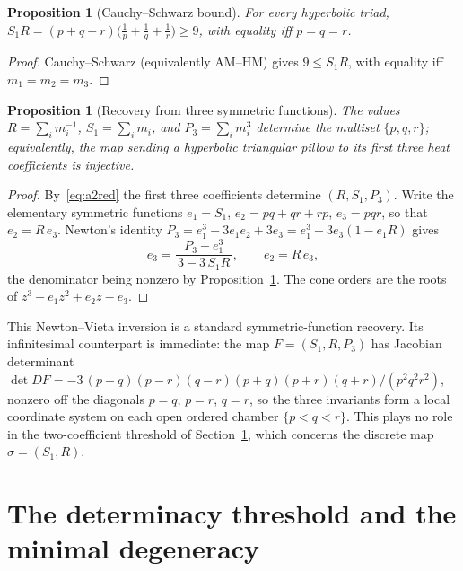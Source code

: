 \documentclass[12pt, letterpaper]{article}
\theoremstyle{definition}
\theoremstyle{plain}
\newtheorem{proposition}[theorem]{Proposition}
\begin{document}
\begin{proposition}[Cauchy--Schwarz bound]\label{prop:cs}
For every hyperbolic triad, $S_1 R=(p+q+r)\big(\tfrac1p+\tfrac1q+\tfrac1r\big)\ge 9$, with equality iff $p=q=r$.
\end{proposition}

\begin{proof}
Cauchy--Schwarz (equivalently AM--HM) gives $9\le S_1 R$, with equality iff $m_1=m_2=m_3$.
\end{proof}

\begin{proposition}[Recovery from three symmetric functions]\label{prop:recovery}
The values $R=\sum_i m_i^{-1}$, $S_1=\sum_i m_i$, and $P_3=\sum_i m_i^{3}$ determine the multiset $\{p,q,r\}$; equivalently, the map sending a hyperbolic triangular pillow to its first three heat coefficients is injective.
\end{proposition}

\begin{proof}
By~\eqref{eq:a2red} the first three coefficients determine $(R,S_1,P_3)$. Write the elementary symmetric functions $e_1=S_1$, $e_2=pq+qr+rp$, $e_3=pqr$, so that $e_2=R\,e_3$. Newton's identity $P_3=e_1^3-3e_1e_2+3e_3=e_1^3+3e_3(1-e_1R)$ gives
\begin{equation}
    e_3=\frac{P_3-e_1^{3}}{\,3-3\,S_1 R\,},\qquad e_2=R\,e_3,
    \label{eq:e3}
\end{equation}
the denominator being nonzero by Proposition~\ref{prop:cs}. The cone orders are the roots of $z^3-e_1 z^2+e_2 z-e_3$.
\end{proof}

This Newton--Vieta inversion is a standard symmetric-function recovery. Its infinitesimal counterpart is immediate: the map $F=(S_1,R,P_3)$ has Jacobian determinant $\det DF=-3\,(p-q)(p-r)(q-r)(p+q)(p+r)(q+r)/(p^2q^2r^2)$, nonzero off the diagonals $p=q$, $p=r$, $q=r$, so the three invariants form a local coordinate system on each open ordered chamber $\{p<q<r\}$. This plays no role in the two-coefficient threshold of Section~\ref{sec:threshold}, which concerns the discrete map $\sigma=(S_1,R)$.

\newpage
\section{The determinacy threshold and the minimal degeneracy}
\label{sec:threshold}
\end{document}
